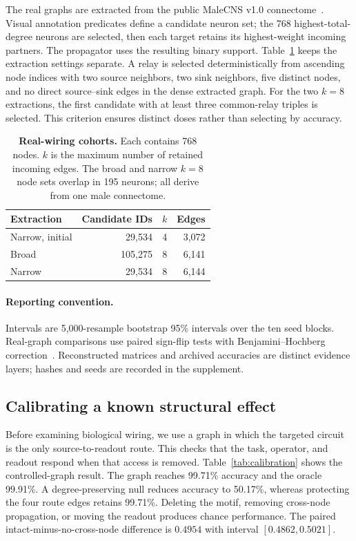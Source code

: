 The real graphs are extracted from the public MaleCNS v1.0
connectome~\cite{malecns2026}. Visual annotation predicates define a
candidate neuron set; the 768 highest-total-degree neurons are selected,
then each target retains its highest-weight incoming partners. The
propagator uses the resulting binary support. Table~\ref{tab:graphs}
keeps the extraction settings separate. A relay is selected
deterministically from ascending node indices with two source neighbors,
two sink neighbors, five distinct nodes, and no direct source--sink edges
in the dense extracted graph. For the two $k=8$ extractions, the first
candidate with at least three common-relay triples is selected. This
criterion ensures distinct doses rather than selecting by accuracy.

\begin{table}[t]
\centering
\caption{\textbf{Real-wiring cohorts.} Each contains 768 nodes.
$k$ is the maximum number of retained incoming edges.
The broad and narrow $k=8$ node sets overlap in 195 neurons; all derive
from one male connectome.}
\label{tab:graphs}
\small
\begin{tabular}{lrrr}
\toprule
Extraction & Candidate IDs & $k$ & Edges \\
\midrule
Narrow, initial & 29,534 & 4 & 3,072 \\
Broad & 105,275 & 8 & 6,141 \\
Narrow & 29,534 & 8 & 6,144 \\
\bottomrule
\end{tabular}
\end{table}

\paragraph{Reporting convention.}
Intervals are 5,000-resample bootstrap 95\% intervals over the ten seed
blocks. Real-graph comparisons use paired sign-flip tests with
Benjamini--Hochberg correction~\cite{benjamini1995}. Reconstructed matrices
and archived accuracies are distinct evidence layers; hashes and seeds are
recorded in the supplement.

\subsection{Calibrating a known structural effect}
\label{sec:calibration}

Before examining biological wiring, we use a graph in which the targeted
circuit is the only source-to-readout route. This checks that the task,
operator, and readout respond when that access is removed. Table~\ref{tab:calibration} shows the
controlled-graph result. The graph reaches 99.71\% accuracy and the oracle
99.91\%. A degree-preserving null reduces accuracy to 50.17\%, whereas
protecting the four route edges retains 99.71\%. Deleting the motif,
removing cross-node propagation, or moving the readout produces chance
performance. The paired intact-minus-no-cross-node difference is
$0.4954$ with interval $[0.4862,0.5021]$.

